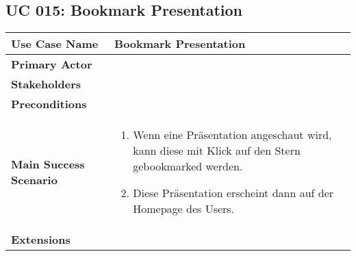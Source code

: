 \subsection{UC 015: Bookmark Presentation}
\label{uc:015-bookmark-pres}

\begin{tabular}{|l|p{}|}
\hline
\textbf{Use Case Name} 	&	Bookmark Presentation	\\ \hline
\textbf{Primary Actor} 	&		\\ \hline
\textbf{Stakeholders}	&		\\ \hline
\textbf{Preconditions}	&		\\ \hline
\textbf{Main Success Scenario}	&
\begin{enumerate}
	\item Wenn eine Präsentation angeschaut wird, kann diese mit Klick auf den Stern gebookmarked werden.
	\item Diese Präsentation erscheint dann auf der Homepage des Users.
\end{enumerate}
\\ \hline
\textbf{Extensions}	& 	\\ \hline
\end{tabular}